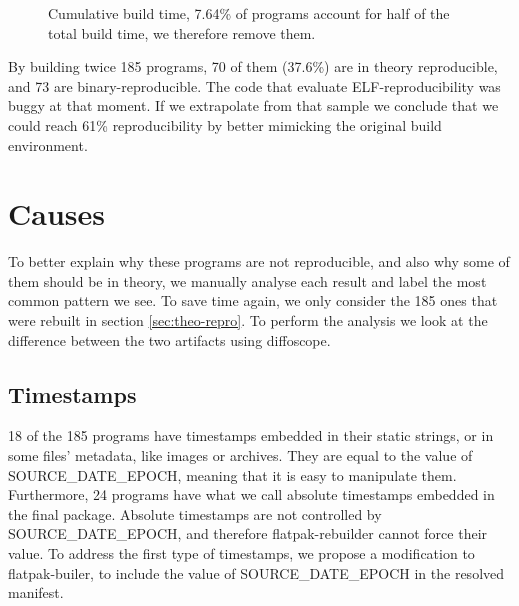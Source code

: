 \documentclass[a4paper,11pt,oneside]{report}
\theoremstyle{definition}
\newcommand{\sysname}{flatpak-rebuilder\xspace}
\newcommand{\fb}{flatpak-builer\xspace}
\newcommand{\sde}{SOURCE\_DATE\_EPOCH\xspace}
\newcommand{\dfc}{diffoscope\xspace}
\begin{document}
\begin{figure}[h]
    \caption{Cumulative build time, 7.64\% of programs
    account for half of the total build time, we therefore remove them.}
    \label{fig:buildtime}
\end{figure}

By building twice 185 programs, 70 of them (37.6\%) are in theory reproducible,
and 73 are binary-reproducible. The code that evaluate ELF-reproducibility was
buggy at that moment. If we extrapolate from that sample we conclude that we
could reach 61\% reproducibility by better mimicking the original build
environment.

\section{Causes}
To better explain why these programs are not reproducible, and also why some of
them should be in theory, we manually analyse each result and label the most
common pattern we see. To save time again, we only consider the 185 ones that
were rebuilt in section \autoref{sec:theo-repro}. To perform the analysis we
look at the difference between the two artifacts using \dfc.

\subsection*{Timestamps}
18 of the 185 programs have timestamps embedded in their static strings, or in
some files' metadata, like images or archives. They are equal to the value of
\sde, meaning that it is easy to manipulate them. Furthermore, 24 programs have
what we call absolute timestamps embedded in the final package. Absolute
timestamps are not controlled by \sde, and therefore \sysname cannot force
their value. To address the first type of timestamps, we propose a modification
to \fb, to include the value of \sde in the resolved manifest.
\end{document}
